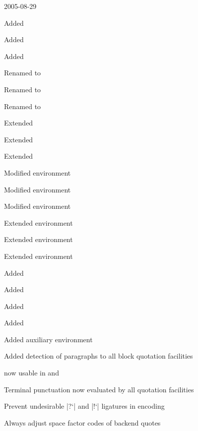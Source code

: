\documentclass{ltxdockit}[2010/09/26]
\begin{document}
\begin{changelog}
\begin{release}{3.1}{2005-08-29}
\item Added 
\item Added 
\item Added 
\item Renamed  to 
\item Renamed  to 
\item Renamed  to 
\item Extended 
\item Extended 
\item Extended 
\item Modified environment 
\item Modified environment 
\item Modified environment 
\item Extended environment 
\item Extended environment 
\item Extended environment 
\item Added 
\item Added 
\item Added 
\item Added 
\item Added auxiliary environment 
\item Added detection of paragraphs to all block quotation facilities
\item {} now usable in  and 
\item Terminal punctuation now evaluated by all quotation facilities
\item Prevent undesirable |?`| and |!`| ligatures in  encoding
\item Always adjust space factor codes of backend quotes
\end{release}


\end{changelog}
\end{document}
